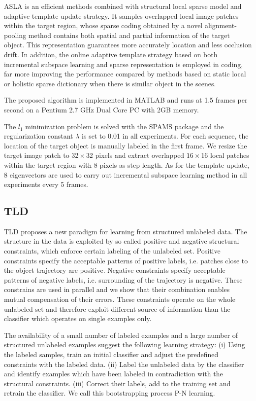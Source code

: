 \documentclass{acm_proc_article-sp}
\begin{document}
ASLA is an efficient methods combined with structural local sparse model and adaptive template update strategy. It samples overlapped local image patches within the target region, whose sparse coding obtained by a novel alignment-pooling method contains both spatial and partial information of the target object. This representation guarantees more accurately location and less occlusion drift. In addition, the online adaptive template strategy based on both incremental subspace learning and sparse representation is employed in coding, far more improving the performance compared by methods based on static local or holistic sparse dictionary when there is similar object in the scenes.

The proposed algorithm is implemented in MATLAB and runs at 1.5 frames per second on a Pentium 2.7 GHz Dual Core PC with 2GB memory.

The $l_1$ minimization problem is solved with the SPAMS package and the regularization constant $\lambda$ is set to 0.01 in all experiments. For each sequence, the location of the target object is manually labeled in the first frame. We resize the target image patch to $32\times 32$ pixels and extract overlapped $16\times16$ local patches within the target region with 8 pixels as step length. As for the template update, 8 eigenvectors are used to carry out incremental subspace learning method in all experiments every 5 frames.

\subsection{TLD}
TLD proposes a new paradigm for learning from structured unlabeled data. The structure in the data is exploited by so called positive and negative structural constraints, which enforce certain labeling of the unlabeled set. Positive constraints specify the acceptable patterns of positive labels, i.e. patches close to the object trajectory are positive. Negative constraints specify acceptable patterns of negative labels, i.e. surrounding of the trajectory is negative. These constrains are used in parallel and we show that their combination enables mutual compensation of their errors. These constraints operate on the whole unlabeled set and therefore exploit different source of information than the classifier which operates on single examples only.

The availability of a small number of labeled examples and a large number of structured unlabeled examples suggest the following learning strategy: (i) Using the labeled samples, train an initial classifier and adjust the predefined constraints with the labeled data. (ii) Label the unlabeled data by the classifier and identify examples which have been labeled in contradiction with the structural constraints. (iii) Correct their labels, add to the training set and retrain the classifier. We call this bootstrapping process P-N learning.
\end{document}
